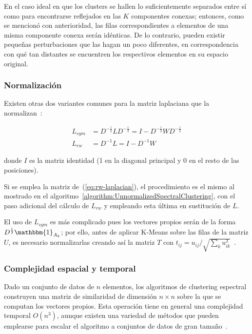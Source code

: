 En el caso ideal en que los clusters se hallen lo suficientemente separados entre sí como para encontrarse reflejados en las $K$ componentes conexas;
entonces, como se mencionó con anterioridad, las filas correspondientes a elementos de una misma componente conexa serán idénticas.
De lo contrario, pueden existir pequeñas perturbaciones que las hagan un poco diferentes, en correspondencia con qué tan distantes se encuentren los respectivos elementos en su espacio original.

\subsubsection{Normalización}

Existen otras dos variantes comunes para la matriz laplaciana que la normalizan~\cite{Aggarawal13}:

\begin{align}
    \label{eq:sym-laplacian}
    L_{sym} & = D^{-\frac{1}{2}}LD^{-\frac{1}{2}} = I - D^{-\frac{1}{2}} W D^{-\frac{1}{2}} \\
    \label{eq:rw-laplacian}
    L_{rw} & = D^{-1}L = I - D^{-1}W
\end{align}

\noindent donde $I$ es la matriz identidad (1 en la diagonal principal y 0 en el resto de las posiciones).

Si se emplea la matriz de~(\ref{eq:rw-laplacian}), el procedimiento es el mismo al mostrado en el algoritmo~\ref{algorithm:UnnormalizedSpectralClustering}, con el paso adicional del cálculo de $L_{rw}$ y empleando esta última en sustitución de $L$.

El uso de $L_{sym}$ es más complicado pues los vectores propios serán de la forma $D^{\frac{1}{2}}\mathbbm{1}_{A_k}$; por ello, antes de aplicar K-Means sobre las filas de la matriz $U$, es necesario normalizarlas creando así la matriz $T$ con $t_{ij} = u_{ij}/\sqrt{\sum_{k}{u_{ik}^2}}$~\cite{Murphy12}.

\subsubsection{Complejidad espacial y temporal}

Dado un conjunto de datos de $n$ elementos, los algoritmos de clustering espectral construyen una matriz de similaridad de dimensión $n \times n$ sobre la que se computan los vectores propios.
Esta operación tiene en general una complejidad temporal $O(n^3)$, aunque existen una variedad de métodos que pueden emplearse para escalar el algoritmo a conjuntos de datos de gran tamaño~\cite{Yan09}.

